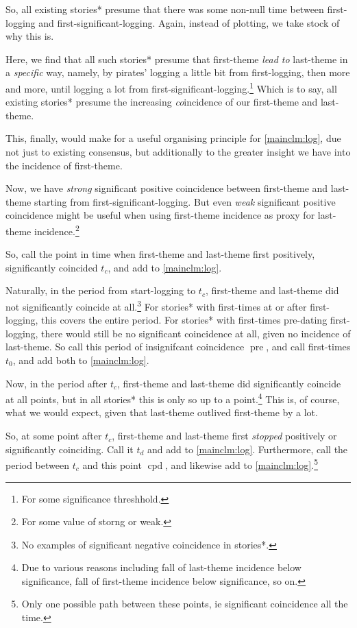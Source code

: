 \documentclass{amsart}
\DeclareMathOperator{\pre}{pre}%
\DeclareMathOperator{\cpd}{cpd}%
\theoremstyle{definition}
\theoremstyle{remark}
\begin{document}
			So, all existing stories* presume that there was some non-null time between first-logging and first-significant-logging. Again, instead of plotting, we take stock of why this is.
			
			Here, we find that all such stories* presume that first-theme \emph{lead to} last-theme in a \emph{specific} way, namely, by pirates' logging a little bit from first-logging, then more and more, until logging a lot from first-significant-logging.\footnote{For some significance threshhold.} Which is to say, all existing stories* presume the increasing \emph{co}incidence of our first-theme and last-theme.
			
			This, finally, would make for a useful organising principle for \ref{mainclm:log}, due not just to existing consensus, but additionally to the greater insight we have into the incidence of first-theme.
			
			Now, we have \emph{strong} significant positive coincidence between first-theme and last-theme starting from first-significant-logging. But even \emph{weak} significant positive coincidence might be useful when using first-theme incidence as proxy for last-theme incidence.\footnote{For some value of storng or weak.}
			
			So, call the point in time when first-theme and last-theme first positively, significantly coincided \(t_c\), and add to \ref{mainclm:log}.
			
			Naturally, in the period from start-logging to \(t_c\), first-theme and last-theme did not significantly coincide at all.\footnote{No examples of significant negative coincidence in stories*.} For stories* with first-times at or after first-logging, this covers the entire period. For stories* with first-times pre-dating first-logging, there would still be no significant coincidence at all, given no incidence of last-theme. So call this period of insignifcant coincidence \(\pre\), and call first-times \(t_0\), and add both to \ref{mainclm:log}.
			
			Now, in the period after \(t_c\), first-theme and last-theme did significantly coincide at all points, but in all stories* this is only so up to a point.\footnote{Due to various reasons including fall of last-theme incidence below significance, fall of first-theme incidence below significance, so on.} This is, of course, what we would expect, given that last-theme outlived first-theme by a lot.
			
			So, at some point after \(t_c\), first-theme and last-theme first \emph{stopped} positively or significantly coinciding. Call it \(t_d\) and add to \ref{mainclm:log}. Furthermore, call the period between \(t_c\) and this point \(\cpd\), and likewise add to \ref{mainclm:log}.\footnote{Only one possible path between these points, ie significant coincidence all the time.}
			
\end{document}
